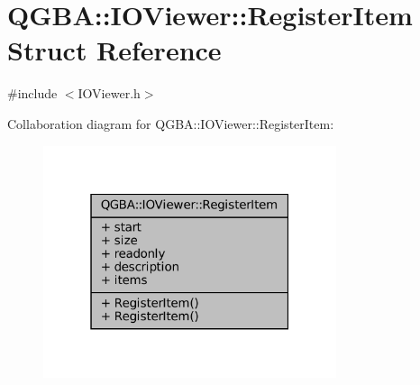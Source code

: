 \hypertarget{struct_q_g_b_a_1_1_i_o_viewer_1_1_register_item}{}\section{Q\+G\+BA\+:\+:I\+O\+Viewer\+:\+:Register\+Item Struct Reference}
\label{struct_q_g_b_a_1_1_i_o_viewer_1_1_register_item}


{\ttfamily \#include $<$I\+O\+Viewer.\+h$>$}



Collaboration diagram for Q\+G\+BA\+:\+:I\+O\+Viewer\+:\+:Register\+Item\+:
\nopagebreak
\begin{figure}[H]
\begin{center}
\leavevmode
\includegraphics[width=244pt]{struct_q_g_b_a_1_1_i_o_viewer_1_1_register_item__coll__graph}
\end{center}
\end{figure}
